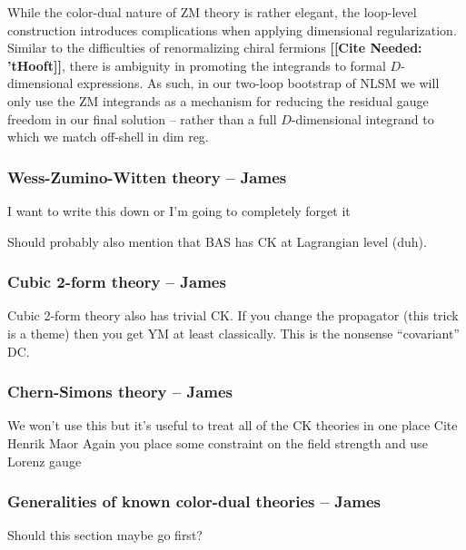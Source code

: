 \documentclass[11pt,letter]{article}
\newcommand{\citepls}[1]{{\bf\color{red}[[Cite Needed:#1]]}}
\begin{document}
While the color-dual nature of ZM theory is rather elegant, the loop-level construction introduces complications when applying dimensional regularization. Similar to the difficulties of renormalizing chiral fermions \citepls{ 'tHooft}, there is ambiguity in promoting the integrands to formal $D$-dimensional expressions. As such, in our two-loop bootstrap of NLSM we will only use the ZM integrands as a mechanism for reducing the residual gauge freedom in our final solution -- rather than a full $D$-dimensional integrand to which we match off-shell in dim reg. 

\subsubsection{Wess-Zumino-Witten theory -- James}
I want to write this down or I'm going to completely forget it

Should probably also mention that BAS has CK at Lagrangian level (duh).

\subsubsection{Cubic 2-form theory -- James}

Cubic 2-form theory also has trivial CK.
If you change the propagator (this trick is a theme) then you get YM at least classically.
This is the nonsense ``covariant'' DC.

\subsubsection{Chern-Simons theory -- James}
We won't use this but it's useful to treat all of the CK theories in one place
Cite Henrik Maor
Again you place some constraint on the field strength and use Lorenz gauge

\subsubsection{Generalities of known color-dual theories -- James}
Should this section maybe go first?
\end{document}
